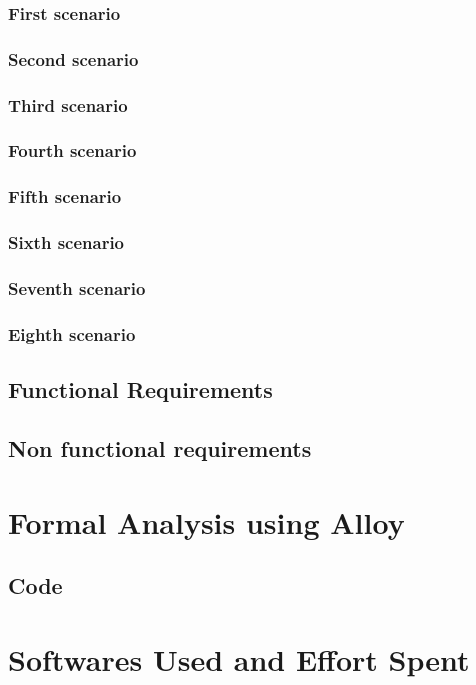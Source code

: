 \documentclass[12pt]{article}
\begin{document}
	\subsubsection{First scenario}
	
	\FloatBarrier
	\subsubsection{Second scenario}
	
	\FloatBarrier
	\clearpage
	\subsubsection{Third scenario}
	
	\FloatBarrier
	\clearpage
	\subsubsection{Fourth scenario}
	
	\FloatBarrier
	\clearpage
	\subsubsection{Fifth scenario}
	
	\FloatBarrier
	\clearpage
	\subsubsection{Sixth scenario}
	
	\FloatBarrier
	\clearpage
	\subsubsection{Seventh scenario}
	
	\FloatBarrier
	\clearpage
	\subsubsection{Eighth scenario}
	
	\FloatBarrier
	\clearpage
	\subsection{Functional Requirements}
	
	\subsection{Non functional requirements}
	

	\clearpage
	\section{Formal Analysis using Alloy}
	
	\subsection{Code}
	
	
	\clearpage
	\section{Softwares Used and Effort Spent}
	
\end{document}
